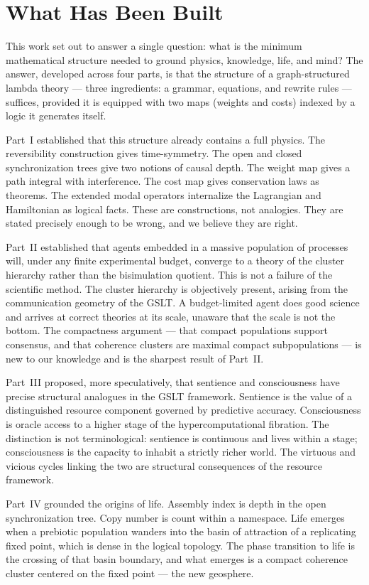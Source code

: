 \chapter*{What Has Been Built}

This work set out to answer a single question: what is the minimum
mathematical structure needed to ground physics, knowledge, life,
and mind?
The answer, developed across four parts, is that the structure of a
graph-structured lambda theory --- three ingredients: a grammar,
equations, and rewrite rules --- suffices, provided it is equipped
with two maps (weights and costs) indexed by a logic it generates
itself.

Part~I established that this structure already contains a full
physics.
The reversibility construction gives time-symmetry.
The open and closed synchronization trees give two notions of
causal depth.
The weight map gives a path integral with interference.
The cost map gives conservation laws as theorems.
The extended modal operators internalize the Lagrangian and
Hamiltonian as logical facts.
These are constructions, not analogies.
They are stated precisely enough to be wrong, and we believe they
are right.

Part~II established that agents embedded in a massive population
of processes will, under any finite experimental budget, converge
to a theory of the cluster hierarchy rather than the bisimulation
quotient.
This is not a failure of the scientific method.
The cluster hierarchy is objectively present, arising from the
communication geometry of the GSLT.
A budget-limited agent does good science and arrives at correct
theories at its scale, unaware that the scale is not the bottom.
The compactness argument --- that compact populations support
consensus, and that coherence clusters are maximal compact
subpopulations --- is new to our knowledge and is the sharpest
result of Part~II.

Part~III proposed, more speculatively, that sentience and
consciousness have precise structural analogues in the GSLT
framework.
Sentience is the value of a distinguished resource component
governed by predictive accuracy.
Consciousness is oracle access to a higher stage of the
hypercomputational fibration.
The distinction is not terminological: sentience is continuous
and lives within a stage; consciousness is the capacity to
inhabit a strictly richer world.
The virtuous and vicious cycles linking the two are structural
consequences of the resource framework.

Part~IV grounded the origins of life.
Assembly index is depth in the open synchronization tree.
Copy number is count within a namespace.
Life emerges when a prebiotic population wanders into the basin
of attraction of a replicating fixed point, which is dense in
the logical topology.
The phase transition to life is the crossing of that basin
boundary, and what emerges is a compact coherence cluster
centered on the fixed point --- the new geosphere.
